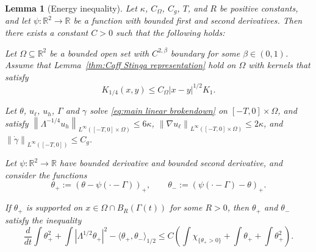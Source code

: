 \documentclass[11pt]{amsart}
\newtheorem{lemma}[theorem]{Lemma}
\theoremstyle{remark}
\theoremstyle{definition}
\newcommand{\R}{\mathbb{R}}
\newcommand{\chevron}[1]{\langle #1 \rangle}
\newcommand{\norm}[1]{\left\lVert#1\right\rVert}
\newcommand{\paren}[1]{\left( #1 \right)}
\newcommand{\bracket}[1]{\left[ #1 \right]}
\newcommand{\abs}[1]{\left\lvert #1 \right\rvert}
\newcommand{\grad}{\nabla}
\newcommand{\ddt}{\frac{d}{dt}}
\newcommand{\Lip}{\text{Lip}}
\newcommand{\indic}[1]{\chi_{\{#1\}}}
\newcommand{\ulow}{u_\ell}
\newcommand{\uhigh}{u_h}
\newcommand{\Cgamma}{C_g}
\newcommand{\Comega}{C_\Omega}
\begin{document}
\begin{lemma}[Energy inequality] \label{thm:energy inequality}
Let $\kappa$, $\Comega$, $\Cgamma$, $T$, and $R$ be positive constants, and let $\psi:\R^2 \to \R$ be a function with bounded first and second derivatives. Then there exists a constant $C>0$ such that the following holds:

Let $\Omega \subseteq \R^2$ be a bounded open set with $C^{2,\beta}$ boundary for some $\beta \in (0,1)$.  Assume that Lemma~\ref{thm:Caff Stinga representation} hold on $\Omega$ with kernels that satisfy
\[ K_{1/4}(x,y) \leq \Comega |x-y|^{1/2} K_{1}. \]

Let $\theta$, $\ulow$, $\uhigh$, $\Gamma$ and $\gamma$ solve \eqref{eq:main linear brokendown} on $[-T,0]\times\Omega$, and satisfy $\norm{\Lambda^{-1/4} \uhigh}_{L^\infty([-T,0]\times\Omega)} \leq 6 \kappa$, $\norm{\grad \ulow}_{L^\infty([-T,0]\times\Omega)} \leq 2\kappa$, and $\norm{\dot{\gamma}}_{L^\infty([-T,0])} \leq \Cgamma$.  

Let $\psi:\R^2 \to \R$ have bounded derivative and bounded second derivative, and consider the functions
\[ \theta_+ := \paren{\theta - \psi(\cdot-\Gamma)}_+, \qquad \theta_- := \paren{\psi(\cdot-\Gamma) - \theta}_+. \]

If $\theta_+$ is supported on $x \in \Omega \cap B_R(\Gamma(t))$ for some $R>0$, then $\theta_+$ and $\theta_-$ satisfy the inequality
\[ \ddt \int \theta_+^2 + \int \abs{\Lambda^{1/2} \theta_+}^2 - \chevron{\theta_+,\theta_-}_{1/2} \leq C \paren{ \int \indic{\theta_+ > 0} + \int \theta_+ + \int \theta_+^2 }. \]
\end{lemma}
\end{document}
